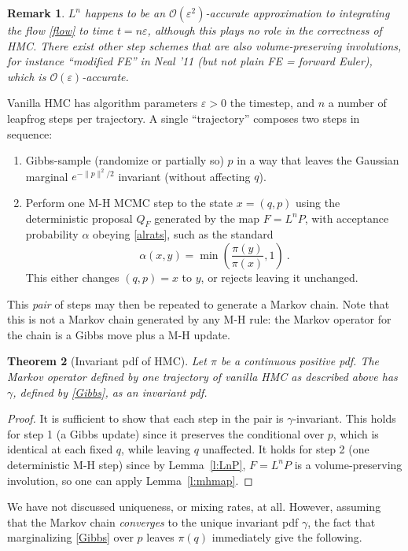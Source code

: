 \documentclass[10pt]{article}
\newcommand{\ben}{\begin{enumerate}}
\newcommand{\een}{\end{enumerate}}
\newcommand{\bigO}{{\mathcal O}}
\newtheorem{thm}{Theorem}
\newtheorem{rmk}[thm]{Remark}
\newcommand{\al}{\alpha}
\newcommand{\eps}{\varepsilon}
\begin{document}
\begin{rmk}
  $L^n$ happens to be
  an $\bigO(\eps^2)$-accurate approximation to integrating the
  flow \eqref{flow} to time $t = n\eps$,
  although this plays no role in the correctness of HMC.
  There exist other step schemes that are also volume-preserving involutions,
  for instance ``modified FE'' in Neal '11 (but not plain FE = forward Euler),
  which is $\bigO(\eps)$-accurate.
\end{rmk}

Vanilla HMC has algorithm parameters $\eps>0$ the timestep, and $n$ a number of leapfrog steps per trajectory.
A single ``trajectory'' composes two steps in sequence:
\ben
\item Gibbs-sample (randomize or partially so) $p$ in a way that leaves the
  Gaussian marginal $e^{-\|p\|^2/2}$ invariant (without affecting $q$).
\item Perform one M-H MCMC step to the state $x=(q,p)$
  using the deterministic proposal $Q_F$ generated by the map $F = L^n P$,
  with acceptance probability $\al$ obeying \eqref{alrats},
  such as the standard
  $$
  \al(x,y) = \min\left(\frac{\pi(y)}{\pi(x)}, 1\right)~.
  $$
  This either changes $(q,p)=x$ to $y$, or rejects leaving it unchanged.
\een
This {\em pair} of steps may then be repeated to generate a Markov chain.
Note that this is not a Markov chain generated by any
M-H rule: the Markov operator for the chain is a Gibbs move plus a M-H update.

\begin{thm}[Invariant pdf of HMC]
  Let $\pi$ be a continuous positive pdf.
  The Markov operator defined by one trajectory of vanilla HMC as
  described above has $\gamma$,
  defined by \eqref{Gibbs}, as an invariant pdf.
  \label{t:hmc}
\end{thm}
\begin{proof}
  It is sufficient to show that each step in the pair is $\gamma$-invariant.
  This holds for step 1 (a Gibbs update) since it preserves the conditional
  over $p$, which is identical at each fixed $q$, while leaving $q$ unaffected.
  It holds for step 2 (one deterministic M-H step) since by
  Lemma~\ref{l:LnP}, $F=L^n P$
  is a volume-preserving involution, so one can apply Lemma~\ref{l:mhmap}.
\end{proof}

We have not discussed uniqueness, or mixing rates, at all.
However, assuming that the Markov chain {\em converges} to the
unique invariant pdf $\gamma$,
the fact that marginalizing \eqref{Gibbs} over $p$ leaves $\pi(q)$
immediately give the following.
\end{document}
